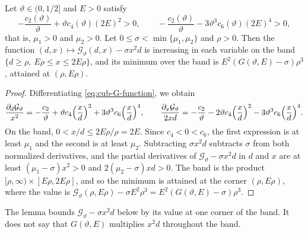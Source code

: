 \begin{lemma}\label{lem:cub-band}
Let $\vartheta\in(0,1/2]$ and $E>0$ satisfy
\begin{equation}\label{b:eq:os-band-checks}
 -\frac{c_2(\vartheta)}\vartheta+\vartheta c_4(\vartheta)(2E)^2>0,\qquad
 -\frac{c_2(\vartheta)}\vartheta-3\vartheta^3c_6(\vartheta)(2E)^4>0,
\end{equation}
that is, $\mu_1>0$ and $\mu_2>0$. Let $0\le\sigma<\min\{\mu_1,\mu_2\}$ and $\rho>0$.
Then the function $(d,x)\mapsto\mathcal G_\vartheta(d,x)-\sigma x^2d$ is
increasing in each variable on the band $\{d\ge\rho,\ E\rho\le x\le2E\rho\}$,
and its minimum over the band is $E^2(G(\vartheta,E)-\sigma)\rho^3$, attained at
$(\rho,E\rho)$.
\end{lemma}

\begin{proof}
Differentiating \eqref{eq:cub-G-function}, we obtain
\[
 \frac{\partial_d\mathcal G_\vartheta}{x^2}
 =-\frac{c_2}\vartheta+\vartheta c_4\Bigl(\frac xd\Bigr)^2
 +3\vartheta^3c_6\Bigl(\frac xd\Bigr)^4,\qquad
 \frac{\partial_x\mathcal G_\vartheta}{2xd}
 =-\frac{c_2}\vartheta-2\vartheta c_4\Bigl(\frac xd\Bigr)^2
 -3\vartheta^3c_6\Bigl(\frac xd\Bigr)^4.
\]
On the band, $0<x/d\le2E\rho/\rho=2E$. Since $c_4<0<c_6$, the first
expression is at least $\mu_1$ and the second is at least $\mu_2$. Subtracting
$\sigma x^2d$ subtracts $\sigma$ from both normalized derivatives, and the partial
derivatives of $\mathcal G_\vartheta-\sigma x^2d$ in $d$ and $x$ are at least
$(\mu_1-\sigma)x^2>0$ and $2(\mu_2-\sigma)xd>0$. The band is the product
$[\rho,\infty)\times[E\rho,2E\rho]$, and so the minimum is attained at the corner
$(\rho,E\rho)$, where the value is
$\mathcal G_\vartheta(\rho,E\rho)-\sigma E^2\rho^3=E^2(G(\vartheta,E)-\sigma)\rho^3$.
\end{proof}

The lemma bounds $\mathcal G_\vartheta-\sigma x^2d$ below by its value at one
corner of the band. It does not say that $G(\vartheta,E)$ multiplies $x^2d$
throughout the band.

